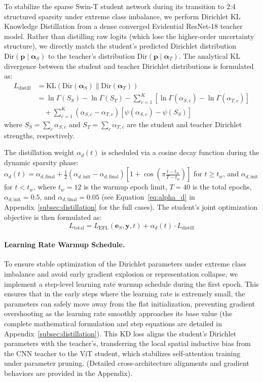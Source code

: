 \documentclass[letterpaper]{article} %
\newcommand{\Dir}{\text{Dir}}
\newcommand{\KL}{\text{KL}}
\begin{document}
To stabilize the sparse Swin-T student network during its transition to 2:4 structured sparsity under extreme class imbalance, we perform Dirichlet KL Knowledge Distillation from a dense converged Evidential ResNet-18 teacher model. Rather than distilling raw logits (which lose the higher-order uncertainty structure), we directly match the student's predicted Dirichlet distribution $\Dir(\bm{p} \mid \bm{\alpha}_S)$ to the teacher's distribution $\Dir(\bm{p} \mid \bm{\alpha}_T)$. The analytical KL divergence between the student and teacher Dirichlet distributions is formulated as:
\begin{align}
    L_{\text{distill}} &= \KL(\Dir(\bm{\alpha}_S) \| \Dir(\bm{\alpha}_T)) \nonumber \\
    &= \ln\Gamma(S_S) - \ln\Gamma(S_T) - \sum_{c=1}^K \left[\ln\Gamma(\alpha_{S,c}) - \ln\Gamma(\alpha_{T,c})\right] \nonumber \\
    &\quad + \sum_{c=1}^K (\alpha_{S,c} - \alpha_{T,c})\left[\psi(\alpha_{S,c}) - \psi(S_S)\right] \label{eq:dir_kl_full}
\end{align}
where $S_S = \sum_c \alpha_{S,c}$ and $S_T = \sum_c \alpha_{T,c}$ are the student and teacher Dirichlet strengths, respectively.

The distillation weight $\alpha_d(t)$ is scheduled via a cosine decay function during the dynamic sparsity phase: $\alpha_d(t) = \alpha_{d,\text{final}} + \frac{1}{2}(\alpha_{d,\text{init}} - \alpha_{d,\text{final}}) [1 + \cos(\pi \frac{t - t_w}{T - t_w})]$ for $t \ge t_w$, and $\alpha_{d,\text{init}}$ for $t < t_w$, where $t_w = 12$ is the warmup epoch limit, $T = 40$ is the total epochs, $\alpha_{d,\text{init}} = 0.5$, and $\alpha_{d,\text{final}} = 0.05$ (see Equation~\ref{eq:alpha_d} in Appendix~\ref{subsec:distillation} for the full cases). The student's joint optimization objective is then formulated as:
\begin{equation}\label{eq:total_loss}
    L_{\text{total}} = L_{\text{EFL}}(\bm{e}_S, \bm{y}, t) + \alpha_d(t) \cdot L_{\text{distill}}
\end{equation}

\paragraph{Learning Rate Warmup Schedule.}
To ensure stable optimization of the Dirichlet parameters under extreme class imbalance and avoid early gradient explosion or representation collapse, we implement a step-level learning rate warmup schedule during the first epoch. This ensures that in the early steps where the learning rate is extremely small, the parameters can safely move away from the flat initialization, preventing gradient overshooting as the learning rate smoothly approaches its base value (the complete mathematical formulation and step equations are detailed in Appendix~\ref{subsec:distillation}).
This KD loss aligns the student's Dirichlet parameters with the teacher's, transferring the local spatial inductive bias from the CNN teacher to the ViT student, which stabilizes self-attention training under parameter pruning. (Detailed cross-architecture alignments and gradient behaviors are provided in the Appendix).
\end{document}
